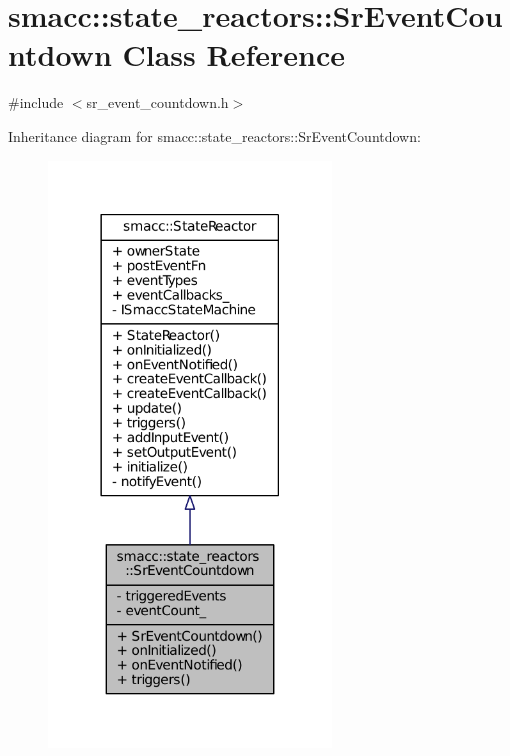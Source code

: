 \hypertarget{classsmacc_1_1state__reactors_1_1SrEventCountdown}{}\section{smacc\+:\+:state\+\_\+reactors\+:\+:Sr\+Event\+Countdown Class Reference}
\label{classsmacc_1_1state__reactors_1_1SrEventCountdown}


{\ttfamily \#include $<$sr\+\_\+event\+\_\+countdown.\+h$>$}



Inheritance diagram for smacc\+:\+:state\+\_\+reactors\+:\+:Sr\+Event\+Countdown\+:
\nopagebreak
\begin{figure}[H]
\begin{center}
\leavevmode
\includegraphics[width=213pt]{classsmacc_1_1state__reactors_1_1SrEventCountdown__inherit__graph}
\end{center}
\end{figure}


